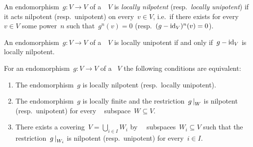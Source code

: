 \begin{definition}
  An endomorphism~$g \colon V \to V$ of a~{\kvs}~$V$ is \emph{locally nilpotent} (resp.\ \emph{locally unipotent}) if it acts nilpotent (resp.\ unipotent) on every~$v \in V$, i.e.\ if there exists for every~$v \in V$ some power~$n$ such that~$g^n(v) = 0$ (resp.~$(g - \operatorname{id}_V)^n(v) = 0$).
\end{definition}


\begin{remark}
  An endomorphism~$g \colon V \to V$ of a~{\kvs}~$V$ is locally unipotent if and only if~$g - \operatorname{id}_V$ is locally nilpotent.
\end{remark}


\begin{lemma}
  \label{characterization of locally potent}
  For an endomorphism~$g \colon V \to V$ of a {\kvs}~$V$ the following conditions are equivalent:
  \begin{enumerate}
    \item
      \label{locally potent}
      The endomorphism~$g$ is locally nilpotent (resp.\ locally unipotent).
    \item
      \label{locally finite and all fd subspaces}
      The endomorphism~$g$ is locally finite and the restriction~$\restrict{g}{W}$ is nilpotent (resp.\ unipotent) for every {\fd}~ subspace~$W \subseteq V$.
    \item
      \label{a covering by fd subspaces}
      There exists a covering~$V = \bigcup_{i \in I} W_i$ by~{\fd}~ subspaces~$W_i \subseteq V$ such that the restriction~$\restrict{g}{W_i}$ is nilpotent (resp.\ unipotent) for every~$i \in I$.
  \end{enumerate}
\end{lemma}


